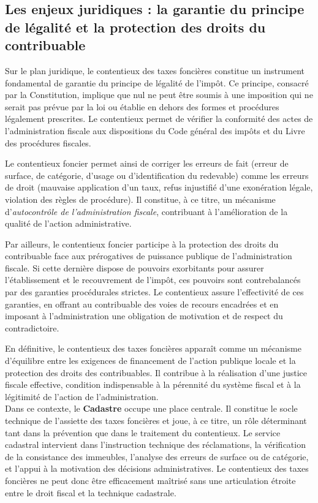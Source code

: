 \documentclass[Cours_contentieuxTF2026.tex]{subfiles}
\begin{document}
\subsection*{Les enjeux juridiques : la garantie du principe de légalité et la protection des droits
	du contribuable}

Sur le plan juridique, le contentieux des taxes foncières constitue un instrument fondamental de
garantie du principe de légalité de l’impôt. Ce principe, consacré par la Constitution, implique que
nul ne peut être soumis à une imposition qui ne serait pas prévue par la loi ou établie en dehors des
formes et procédures légalement prescrites. Le contentieux permet de vérifier la conformité des
actes de l’administration fiscale aux dispositions du Code général des impôts et du Livre des
procédures fiscales.

\noindent Le contentieux foncier permet ainsi de corriger les erreurs de fait (erreur de surface, de catégorie,
d’usage ou d’identification du redevable) comme les erreurs de droit (mauvaise application d’un
taux, refus injustifié d’une exonération légale, violation des règles de procédure). Il constitue, à ce
titre, un mécanisme d’\emph{autocontrôle de l’administration fiscale}, contribuant à l’amélioration de
la qualité de l’action administrative.

\noindent Par ailleurs, le contentieux foncier participe à la protection des droits du contribuable face aux
prérogatives de puissance publique de l’administration fiscale. Si cette dernière dispose de pouvoirs
exorbitants pour assurer l’établissement et le recouvrement de l’impôt, ces pouvoirs sont
contrebalancés par des garanties procédurales strictes. Le contentieux assure l’effectivité de ces
garanties, en offrant au contribuable des voies de recours encadrées et en imposant à
l’administration une obligation de motivation et de respect du contradictoire.

\noindent En définitive, le contentieux des taxes foncières apparaît comme un mécanisme d’équilibre entre les
exigences de financement de l’action publique locale et la protection des droits des contribuables.
Il contribue à la réalisation d’une justice fiscale effective, condition indispensable à la
pérennité du système fiscal et à la légitimité de l’action de l’administration.\\

\noindent Dans ce contexte, le \textbf{Cadastre} occupe une place centrale. Il constitue le socle technique de 
l’assiette des taxes foncières et joue, à ce titre, un rôle déterminant tant dans la prévention que 
dans le traitement du contentieux. Le service cadastral intervient dans l’instruction technique des 
réclamations, la vérification de la consistance des immeubles, l’analyse des erreurs de surface ou 
de catégorie, et l’appui à la motivation des décisions administratives. Le contentieux des taxes 
foncières ne peut donc être efficacement maîtrisé sans une articulation étroite entre le droit fiscal 
et la technique cadastrale.\\
\end{document}
